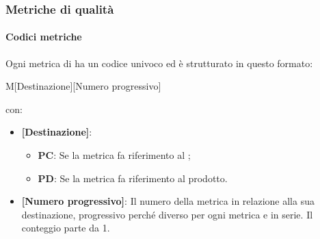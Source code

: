 \subsubsection{Metriche di qualità}
\paragraph{Codici metriche}\mbox{}
Ogni metrica di  ha un codice univoco ed è strutturato in questo formato:
\begin{center}
    M[Destinazione][Numero progressivo]
\end{center}
con:
\begin{itemize}  
    \item \textbf{[Destinazione]}:
    \begin{itemize}
        \item \textbf{PC}: Se la metrica fa riferimento al ;
        \item \textbf{PD}: Se la metrica fa riferimento al prodotto.
    \end{itemize}
    \item \textbf{[Numero progressivo]}: Il numero della metrica in relazione alla sua destinazione, progressivo perché diverso per ogni metrica e in serie. Il conteggio parte da 1.
\end{itemize}

